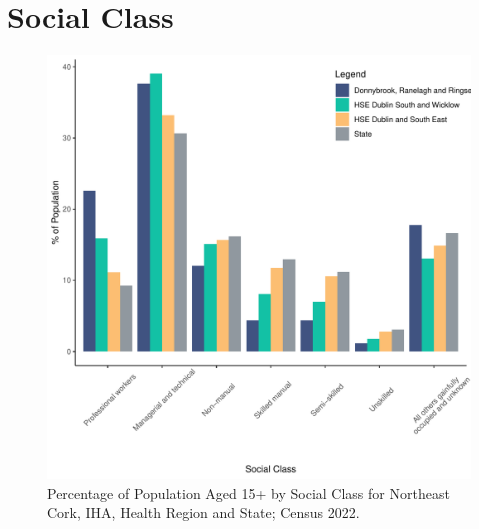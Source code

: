 \documentclass{article}
\begin{document}
\section{Social Class}\label{sect:SC}
\begin{figure}[H]
	\centering
	\includegraphics[width = 140mm]{../figures/SocialClassED.pdf}
	\caption{Percentage of Population Aged 15+ by Social Class for Northeast Cork, IHA, Health Region and State; Census 2022.}
	\label{fig:vbnv}
	\end{figure}
\end{document}
